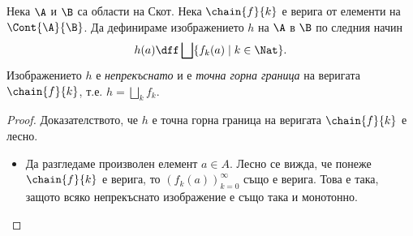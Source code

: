 \begin{framed}
  \begin{lemma}
    Нека $\A$ и $\B$ са области на Скот.
    Нека $\chain{f}{k}$ е верига от елементи на $\Cont{\A}{\B}$.
    Да дефинираме изображението $h$ на $\A$ в $\B$ по следния начин
    \[h(a) \dff \bigsqcup\{f_k(a) \mid k \in \Nat\}.\]
    Изображението $h$ е {\em непрекъснато} и е {\em точна горна граница} на веригата $\chain{f}{k}$,
    т.е. $h = \bigsqcup_k f_k$.
  \end{lemma}
\end{framed}
\begin{proof}
  \ifhints
  Доказателството, че $h$ е точна горна граница на веригата $\chain{f}{k}$ е лесно.
  \begin{itemize}
  \item 
    Да разгледаме произволен елемент $a \in A$.
    Лесно се вижда, че понеже $\chain{f}{k}$ е верига, то $(f_k(a))^\infty_{k=0}$ също е верига.
    Това е така, защото всяко непрекъснато изображение е също така и монотонно.


\end{itemize}
\end{proof}
